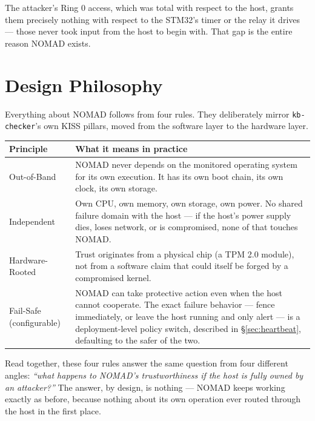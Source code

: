 \documentclass[11pt,a4paper]{article}
\begin{document}
The attacker's Ring 0 access, which was total with respect to the host,
grants them precisely nothing with respect to the STM32's timer or the
relay it drives --- those never took input from the host to begin with.
That gap is the entire reason NOMAD exists.

\section{Design Philosophy}
\label{sec:philosophy}

Everything about NOMAD follows from four rules. They deliberately mirror
\texttt{kb-checker}'s own KISS pillars, moved from the software layer to
the hardware layer.

\begin{center}
\renewcommand{\arraystretch}{1.35}
\begin{tabular}{@{}p{3.1cm}p{10.6cm}@{}}
\toprule
\textbf{Principle} & \textbf{What it means in practice} \\
\midrule
Out-of-Band & NOMAD never depends on the monitored operating system for
its own execution. It has its own boot chain, its own clock, its own
storage. \\
Independent & Own CPU, own memory, own storage, own power. No shared
failure domain with the host --- if the host's power supply dies,
loses network, or is compromised, none of that touches NOMAD. \\
Hardware-Rooted & Trust originates from a physical chip (a TPM 2.0
module), not from a software claim that could itself be forged by a
compromised kernel. \\
Fail-Safe (configurable) & NOMAD can take protective action even when
the host cannot cooperate. The exact failure behavior --- fence
immediately, or leave the host running and only alert --- is a
deployment-level policy switch, described in \S\ref{sec:heartbeat},
defaulting to the safer of the two. \\
\bottomrule
\end{tabular}
\end{center}

Read together, these four rules answer the same question from four
different angles: \emph{``what happens to NOMAD's trustworthiness if the
host is fully owned by an attacker?''} The answer, by design, is
nothing --- NOMAD keeps working exactly as before, because nothing about
its own operation ever routed through the host in the first place.
\end{document}
